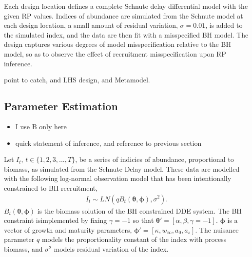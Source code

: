 %
Each design location defines a complete Schnute delay differential model with
the given RP values. Indices of abundance are simulated from the Schnute model
at each design location, a small amount of residual variation, $\sigma = 0.01$,
is added to the simulated index, and the data are then fit with a misspecified
BH model. The design captures various degrees of model misspecification
relative to the BH model, so as to observe the effect of recruitment
misspecification upon RP inference.

%
{\color{red}
point to catch, and LHS design, and Metamodel.
}

%
\subsection{Parameter Estimation}
%
\begin{itemize}
        \item I use B only here
        \item quick statement of inference, and reference to previous section
\end{itemize}

%
Let $I_t$, $t\in\{1,2,3,...,T\}$, be a series of indicies of abundance,
proportional to biomass, as simulated from the Schnute Delay model. These data
are modelled with the following log-normal observation model that has been
intentionally constrained to BH recruitment,
%
\begin{align}
I_t \sim LN(q B_t(\bm{\theta}, \bm{\phi}), \sigma^2). \label{bL}
\end{align}
%
$B_t(\bm{\theta}, \bm{\phi})$ is the biomass solution of the BH constrained DDE system. %
The BH constraint isimplemented by fixing $\gamma=-1$ so that $\bm{\theta}'=[\alpha, \beta, \gamma=-1]$.
$\bm{\phi}$ is a vector of growth and maturity parameters,
$\bm{\phi}'=[\kappa, w_\infty, a_0, a_s]$. The nuisance parameter $q$ models
the proportionality constant of the index with process biomass, and $\sigma^2$
models residual variation of the index.

